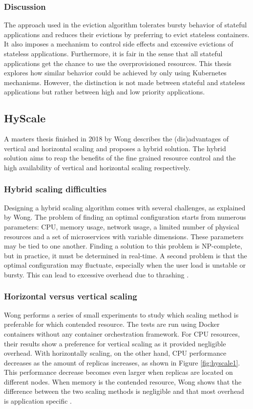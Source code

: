 \subsubsection{Discussion}
The approach used in the eviction algorithm tolerates bursty behavior of stateful applications and reduces their evictions by preferring to evict stateless containers. It also imposes a mechanism to control side effects and excessive evictions of stateless applications. Furthermore, it is fair in the sense that all stateful applications get the chance to use the overprovisioned resources. This thesis explores how similar behavior could be achieved by only using Kubernetes mechanisms. However, the distinction is not made between stateful and stateless applications but rather between high and low priority applications. 


\subsection{HyScale}
\label{hyscale}
A masters thesis finished in 2018 by Wong describes the (dis)advantages of vertical and horizontal scaling and proposes a hybrid solution. The hybrid solution aims to reap the benefits of the fine grained resource control and the high availability of vertical and horizontal scaling respectively. 

\subsubsection{Hybrid scaling difficulties}
Designing a hybrid scaling algorithm comes with several challenges, as explained by Wong. The problem of finding an optimal configuration starts from numerous parameters: CPU, memory usage, network usage, a limited number of physical resources and a set of microservices with variable dimensions. These parameters may be tied to one another. Finding a solution to this problem is NP-complete, but in practice, it must be determined in real-time. A second problem is that the optimal configuration may fluctuate, especially when the user load is unstable or bursty. This can lead to excessive overhead due to thrashing \citep{hyscale}.\\

\subsubsection{Horizontal versus vertical scaling}
Wong performs a series of small experiments to study which scaling method is preferable for which contended resource. The tests are run using Docker containers without any container orchestration framework. For CPU resources, their results show a preference for vertical scaling as it provided negligible overhead. With horizontally scaling, on the other hand, CPU performance decreases as the amount of replicas increases, as shown in Figure \ref{fig:hyscale1}. This performance decrease becomes even larger when replicas are located on different nodes. When memory is the contended resource, Wong shows that the difference between the two scaling methods is negligible and that most overhead is application specific \citep{hyscale}.\\

